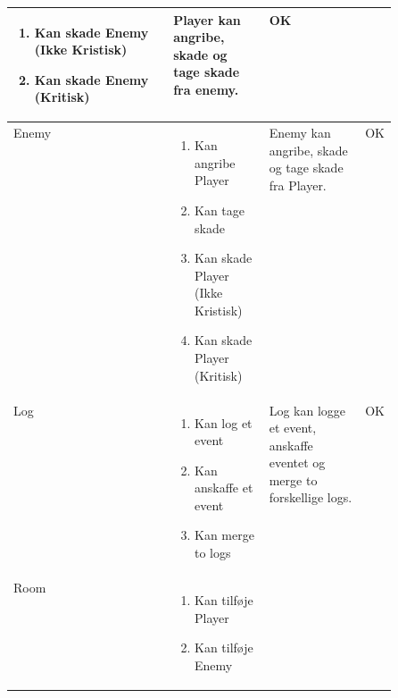 \begin{center}
\begin{longtable}{|l|p{0.25\linewidth}|p{0.25\linewidth}|l|}
\begin{enumerate}
    \item \begin{flushleft} Kan skade Enemy (Ikke Kristisk)  \end{flushleft}
    \item \begin{flushleft} Kan skade Enemy (Kritisk)  \end{flushleft}
  \end{enumerate}
  &
  \flushleft
  Player kan angribe, skade og tage skade fra enemy.
  &
  OK
  \\ \hline
  Enemy
  &
  \begin{enumerate}
    \item \begin{flushleft} Kan angribe Player  \end{flushleft}
    \item \begin{flushleft} Kan tage skade \end{flushleft}
    \item \begin{flushleft} Kan skade Player (Ikke Kristisk)  \end{flushleft}
    \item \begin{flushleft} Kan skade Player (Kritisk)  \end{flushleft}
  \end{enumerate}
  &
  \flushleft
  Enemy kan angribe, skade og tage skade fra Player.
  &
  OK
  \\ \hline
  Log
  &
  \begin{enumerate}
    \item \begin{flushleft} Kan log et event \end{flushleft}
    \item \begin{flushleft} Kan anskaffe et event \end{flushleft}
    \item \begin{flushleft} Kan merge to logs \end{flushleft}
  \end{enumerate}
  &
  \flushleft
  Log kan logge et event, anskaffe eventet og merge to forskellige logs.
  &
  OK
  \\ \hline
  Room                          
  & 
  \begin{enumerate}
    \item Kan tilføje Player
    \item Kan tilføje Enemy

\end{enumerate}
\end{longtable}
\end{center}
